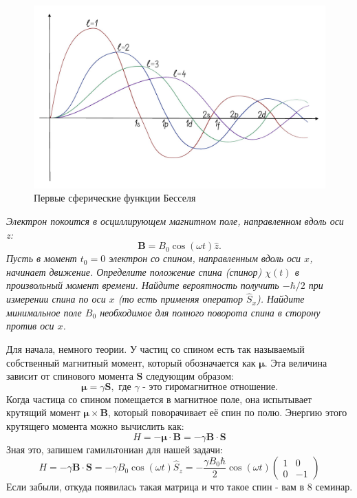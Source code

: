 \begin{figure}[h!]
\centering
\includegraphics[scale=0.3]{class 10/images/bessel.jpg}
\caption{Первые сферические функции Бесселя}
\label{fig 10.1}
\end{figure}



\begin{center}
    \textit{Электрон покоится в осциллирующем магнитном поле, направленном вдоль оси z:}
    \[
    \mathbf{B} = B_0\cos(\omega t)\hat{z}.
    \]
    \textit{Пусть в момент $t_0 = 0$ электрон со спином, направленным вдоль оси $x$, начинает движение. Определите положение спина (спинор) $\chi(t)$ в произвольный момент времени. Найдите вероятность получить $-\hbar/2$ при измерении спина по оси $x$ (то есть применяя оператор $\hat{S}_x$). Найдите минимальное поле $B_0$ необходимое для полного поворота спина в сторону против оси $x$.}
\end{center}

Для начала, немного теории. У частиц со спином есть так называемый собственный магнитный момент, который обозначается как $\boldsymbol{\mu}$. Эта величина зависит от спинового момента $\mathbf{S}$ следующим образом:
\[
\boldsymbol{\mu} = \gamma \mathbf{S}, \text{ где $\gamma$ - это гиромагнитное отношение.}
\]
Когда частица со спином помещается в магнитное поле, она испытывает крутящий момент $\boldsymbol{\mu} \times \mathbf{B}$, который поворачивает её спин по полю. Энергию этого крутящего момента можно вычислить как:
\[
H = -\boldsymbol{\mu}\cdot\mathbf{B} = -\gamma\mathbf{B}\cdot\mathbf{S}
\]
Зная это, запишем гамильтониан для нашей задачи:
\[
H = -\gamma\mathbf{B}\cdot\mathbf{S} = -\gamma B_0\cos(\omega t) \hat{S}_z = -\frac{\gamma B_0\hbar}{2}\cos(\omega t)\begin{pmatrix} 1 & 0 \\ 0 & -1 \end{pmatrix}
\]
Если забыли, откуда появилась такая матрица и что такое спин - вам в 8 семинар. 

